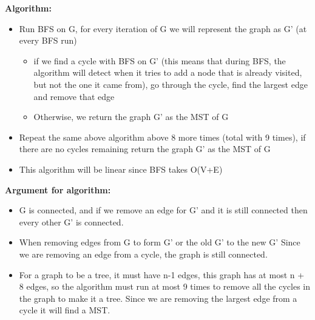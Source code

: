 \documentclass[]{article}
\begin{document}
\textbf{Algorithm:}
\begin{itemize}
    \item Run BFS on G, for every iteration of G we will represent the graph as G' (at every BFS run)
    \begin{itemize}
        \item if we find a cycle with BFS on G' (this means that during BFS, the algorithm will detect when it tries to add a node that is already visited, but not the one it came from), go through the cycle, find the largest edge and remove that edge
        \item Otherwise, we return the graph G' as the MST of G
    \end{itemize}
    \item Repeat the same above algorithm above 8 more times (total with 9 times), if there are no cycles remaining return the graph G' as the MST of G
    \item This algorithm will be linear since BFS takes O(V+E)
\end{itemize}

\textbf{Argument for algorithm:}
\begin{itemize}
    \item G is connected, and if we remove an edge for G' and it is still connected then every other G' is connected. 
    \item When removing edges from G to form G' or the old G' to the new G' Since we are removing an edge from a cycle, the graph is still connected.
    \item For a graph to be a tree, it must have n-1 edges, this graph has at most n + 8 edges, so the algorithm must run at most 9 times to remove all the cycles in the graph to make it a tree. Since we are removing the largest edge from a cycle it will find a MST.
\end{itemize}
\clearpage
\end{document}
